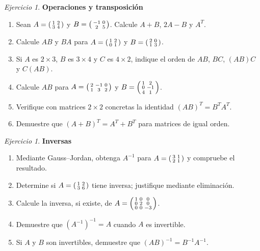 \documentclass[12pt]{article}
\theoremstyle{remark}
\newtheorem{Ejer}[definicion]{Ejercicio}
\begin{document}
\begin{Ejer} \textbf{Operaciones y transposición}
\begin{enumerate}[resume=banco]
\item Sean $A=\begin{psmallmatrix}1&2\\3&4\end{psmallmatrix}$ y $B=\begin{psmallmatrix}-1&0\\2&5\end{psmallmatrix}$. Calcule $A+B$, $2A-B$ y $A^T$.
\item Calcule $AB$ y $BA$ para $A=\begin{psmallmatrix}1&2\\0&1\end{psmallmatrix}$ y $B=\begin{psmallmatrix}2&0\\1&3\end{psmallmatrix}$.
\item Si $A$ es $2\times3$, $B$ es $3\times4$ y $C$ es $4\times2$, indique el orden de $AB$, $BC$, $(AB)C$ y $C(AB)$.
\item Calcule $AB$ para $A=\begin{psmallmatrix}2&-1&0\\1&3&2\end{psmallmatrix}$ y $B=\begin{psmallmatrix}1&2\\0&-1\\4&1\end{psmallmatrix}$.
\item Verifique con matrices $2\times2$ concretas la identidad $(AB)^T=B^TA^T$.
\item Demuestre que $(A+B)^T=A^T+B^T$ para matrices de igual orden.
\end{enumerate}
\end{Ejer}

\begin{Ejer} \textbf{Inversas}
\begin{enumerate}[resume=banco]
\item Mediante Gauss--Jordan, obtenga $A^{-1}$ para $A=\begin{psmallmatrix}3&1\\2&1\end{psmallmatrix}$ y compruebe el resultado.
\item Determine si $A=\begin{psmallmatrix}1&2\\3&6\end{psmallmatrix}$ tiene inversa; justifique mediante eliminación.
\item Calcule la inversa, si existe, de $A=\begin{psmallmatrix}1&0&0\\0&2&0\\0&0&-3\end{psmallmatrix}$.
\item Demuestre que $(A^{-1})^{-1}=A$ cuando $A$ es invertible.
\item Si $A$ y $B$ son invertibles, demuestre que $(AB)^{-1}=B^{-1}A^{-1}$.
\end{enumerate}
\end{Ejer}
\end{document}
